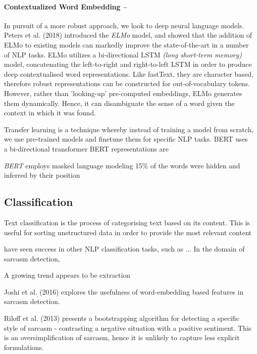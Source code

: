 \documentclass[12pt,a4paper]{article}
\begin{document}
\paragraph{Contextualized Word Embedding --}
In pursuit of a more robust approach, we look to deep neural language models. Peters et al. (2018) \cite{peters2018deep} introduced the \textit{ELMo} model, and showed that the addition of ELMo to existing models can markedly improve the state-of-the-art in a number of NLP tasks. ELMo utilizes a bi-directional LSTM \textit{(long short-term memory)} model, concatenating the left-to-right and right-to-left LSTM in order to produce deep contextualised word representations. Like fastText, they are character based, therefore robust representations can be constructed for out-of-vocabulary tokens. However, rather than 'looking-up' pre-computed embeddings, ELMo generates them dynamically. Hence, it can disambiguate the sense of a word given the context in which it was found. 



Transfer learning is a technique whereby instead of training a model from scratch, we use pre-trained models and finetune them for specific NLP tasks.
BERT uses a bi-directional transformer
BERT representations are 

 \textit{BERT} \cite{devlin2018bert}
 employs masked language modeling
 15\% of the words were hidden and inferred by their position

\newpage

\subsection{Classification}
Text classification is the process of categorising text based on its content. This is useful for sorting unstructured data in order to provide the most relevant content

have seen success in other NLP classification tasks, such as ... In the domain of sarcasm detection, 

A growing trend appears to be extraction 


Joshi et al. (2016) explores the usefulness of word-embedding based features in sarcasm detection. 

Riloff et al. (2013) presents a bootstrapping algorithm for detecting a specific style of sarcasm - contrasting a negative situation with a positive sentiment. This is an oversimplification of sarcasm, hence it is unlikely to capture less explicit formulations.
\end{document}
